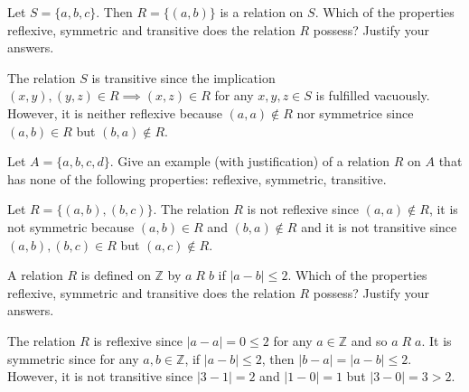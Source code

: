 \documentclass[12pt]{article}
\newcommand{\Z}{\mathbb{Z}}
\newenvironment{problem}[2][Problem]{\begin{trivlist}
		\item[\hskip \labelsep {\bfseries #1}\hskip \labelsep {\bfseries #2.}]}{\end{trivlist}}
\newenvironment{solution}[2][Solution]{\begin{trivlist}
		\item[\hskip \labelsep {\bfseries #1}\hskip \labelsep {\bfseries #2.}]}{\end{trivlist}}
\begin{document}
 	\begin{problem}{13}
 		Let $S=\{a,b,c\}$. Then $R=\{(a,b)\}$ is a relation on $S$. Which of the properties reflexive, symmetric and transitive does the relation $R$ possess? Justify your answers.
 		\begin{solution}{13}
 			The relation $S$ is transitive since the implication $(x,y),(y,z)\in R \implies (x,z)\in R$ for any $x,y,z\in S$ is fulfilled vacuously. However, it is neither reflexive because $(a,a)\not\in R$ nor symmetrice since $(a,b)\in R$ but $(b,a)\not\in R$.
 		\end{solution}
 	\end{problem}
 
 	\begin{problem}{14}
 		Let $A=\{a,b,c,d\}$. Give an example (with justification) of a relation $R$ on $A$ that has none of the following properties: reflexive, symmetric, transitive.
 		\begin{solution}{14}
 			Let $R=\{(a,b),(b,c)\}$. The relation $R$ is not reflexive since $(a,a)\not\in R$, it is not symmetric because $(a,b) \in R$ and $(b,a)\not\in R$ and it is not transitive since $(a,b),(b,c)\in R$ but $(a,c)\not\in R$.
 		\end{solution}
 	\end{problem}
 
 	\begin{problem}{15}
 		A relation $R$ is defined on $\Z$ by $a \; R \; b$ if $|a-b|\leq 2$. Which of the properties reflexive, symmetric and transitive does the relation $R$ possess? Justify your answers.
 		\begin{solution}{15}
 			The relation $R$ is reflexive since $|a-a| = 0\leq 2$ for any $a\in \Z$ and so $a \; R \; a$. It is symmetric since for any $a,b\in \Z$, if $|a-b| \leq 2$, then $|b-a|=|a-b|\leq 2$. However, it is not transitive since $|3-1|=2$ and $|1-0|=1$ but $|3-0| = 3>2$.
 		\end{solution}
 	\end{problem} 
 
\end{document}
